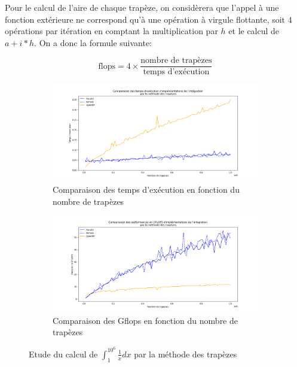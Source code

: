 \documentclass{article}
\begin{document}
Pour le calcul de l'aire de chaque trapèze, on considèrera que l'appel à une fonction extérieure ne correspond qu'à une opération à virgule flottante, soit $4$ opérations par itération en comptant la multiplication par $h$ et le calcul de $a + i * h$. On a donc la formule suivante:

$$\mbox{flops} = 4 \times \frac{\mbox{nombre de trapèzes}}{\mbox{temps d'exécution}}$$

\begin{figure}[!htb]

	\begin{subfigure}{\textwidth}
		\centering
		\includegraphics[width=\linewidth]{Time_itg.png}  
		\caption{Comparaison des temps d'exécution en fonction du nombre de trapèzes}
		\label{fig:time_itg}
	\end{subfigure}

	\begin{subfigure}{\textwidth}
		\centering
		\includegraphics[width=\linewidth]{Flops_itg.png}  
		\caption{Comparaison des G\gls{flops} en fonction du nombre de trapèzes}
		\label{fig:flops_itg}
	\end{subfigure}
	\caption{Etude du calcul de $\int_{1}^{10^6}\frac{1}{x}dx$ par la méthode des trapèzes}
	\label{fig:itg_acc_ker_omp}
\end{figure}
\end{document}
